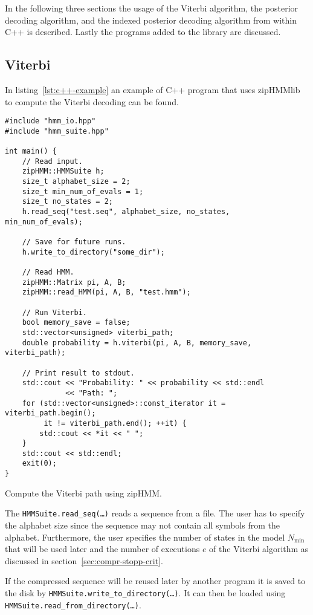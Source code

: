 In the following three sections the usage of the Viterbi algorithm, the
posterior decoding algorithm, and the indexed posterior decoding algorithm from
within C++ is described. Lastly the programs added to the library are
discussed.

\subsection{Viterbi}

In listing~\ref{lst:c++-example} an example of C++ program that uses zipHMMlib
to compute the Viterbi decoding can be found.

\begin{listing}
\begin{verbatim}
#include "hmm_io.hpp"
#include "hmm_suite.hpp"

int main() {
    // Read input.
    zipHMM::HMMSuite h;
    size_t alphabet_size = 2;
    size_t min_num_of_evals = 1;
    size_t no_states = 2;
    h.read_seq("test.seq", alphabet_size, no_states, min_num_of_evals);

    // Save for future runs.
    h.write_to_directory("some_dir");

    // Read HMM.
    zipHMM::Matrix pi, A, B;
    zipHMM::read_HMM(pi, A, B, "test.hmm");

    // Run Viterbi.
    bool memory_save = false;
    std::vector<unsigned> viterbi_path;
    double probability = h.viterbi(pi, A, B, memory_save, viterbi_path);

    // Print result to stdout.
    std::cout << "Probability: " << probability << std::endl
              << "Path: ";
    for (std::vector<unsigned>::const_iterator it = viterbi_path.begin();
         it != viterbi_path.end(); ++it) {
        std::cout << *it << " ";
    }
    std::cout << std::endl;
    exit(0);
}
\end{verbatim}
\caption{Compute the Viterbi path using zipHMM.}
\label{lst:c++-example}
\end{listing}

The \texttt{HMMSuite.read\_seq(\dots)} reads a sequence from a file. The user
has to specify the alphabet size since the sequence may not contain all
symbols from the alphabet. Furthermore, the user specifies the number of states
in the model $N_{\min}$ that will be used later and the number of executions
$e$ of the Viterbi algorithm as discussed in
section~\ref{sec:compr-stopp-crit}.

If the compressed sequence will be reused later by another program it is saved
to the disk by \texttt{HMMSuite.write\_to\_directory(\dots)}. It can then be
loaded using \texttt{HMMSuite.read\_from\_directory(\dots)}.

